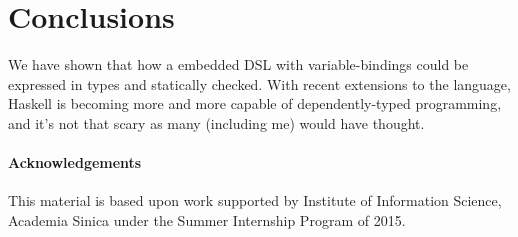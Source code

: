 \documentclass[pldi]{sigplanconf-pldi16}
\begin{document}
\section{Conclusions}

We have shown that how a embedded DSL with variable-bindings could be expressed
 in types and statically checked. With recent extensions to the language,
 Haskell is becoming more and more capable of dependently-typed programming, and
 it's not that scary as many (including me) would have thought.

\paragraph{Acknowledgements}
This material is based upon work supported by Institute of Information Science,
Academia Sinica under the Summer Internship Program of 2015.



\end{document}

